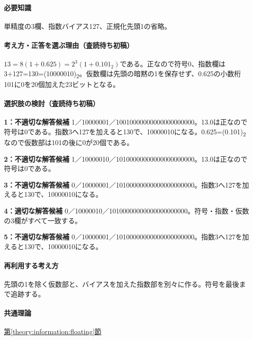 \paragraph{必要知識} 単精度の3欄、指数バイアス127、正規化先頭1の省略。

\paragraph{考え方・正答を選ぶ理由（査読待ち初稿）} \(13=8(1+0.625)=2^3(1+0.101_2)\)である。正なので符号0、指数欄は3+127=\allowbreak{}130=\allowbreak{}(10000010)\textsubscript{2}。仮数欄は先頭の暗黙の1を保存せず、0.625の小数桁101に0を20個加えた23ビットとなる。

\paragraph{選択肢の検討（査読待ち初稿）}\mbox{}\par

\noindent\textbf{1：不適切な解答候補} 1／10000001／10010000000000000000000。13.0は正なので符号は0である。指数3へ127を加えると130で、10000010になる。0.625=\allowbreak{}(0.101)\textsubscript{2}なので仮数部は101の後に0が20個である。\par

\noindent\textbf{2：不適切な解答候補} 1／10000010／10100000000000000000000。13.0は正なので符号は0である。\par

\noindent\textbf{3：不適切な解答候補} 0／10000001／10100000000000000000000。指数3へ127を加えると130で、10000010になる。\par

\noindent\textbf{4：適切な解答候補} 0／10000010／10100000000000000000000。符号・指数・仮数の3欄がすべて一致する。\par

\noindent\textbf{5：不適切な解答候補} 0／10000001／10100000000000000000000。指数3へ127を加えると130で、10000010になる。\par

\paragraph{再利用する考え方} 先頭の1を除く仮数部と、バイアスを加えた指数部を別々に作る。符号を最後まで追跡する。

\paragraph{共通理論} \hyperref[theory:information:floating]{第\ref*{theory:information:floating}節}

